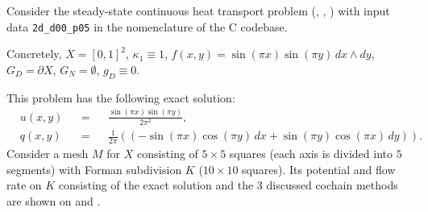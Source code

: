 \begin{example}
  \label{cmc/diffusion/continuous/steady_state/examples/2d_d00_p05-example}
  Consider the steady-state continuous heat transport problem
  (,
   ,
   )
  with input data \verb|2d_d00_p05| in the nomenclature of the C codebase.

  Concretely,
    $X = [0, 1]^2$,
    $\kappa_1 \equiv 1$,
    $f(x, y) = \sin(\pi x) \sin(\pi y) \, d x \wedge d y$,
    $G_D = \partial X$,
    $G_N = \emptyset$,
    $g_D \equiv 0$.

  This problem has the following exact solution:
  \begin{subequations}
    \begin{alignat}{3}
      & u(x, y) && = && \frac{\sin(\pi x) \sin(\pi y)}{2 \pi^2}, \\
      & q(x, y) && = &&
        \frac{1}{2 \pi}
        ((- \sin(\pi x) \cos(\pi y) \, d x + \sin(\pi y) \cos(\pi x)\, d y)).
    \end{alignat}
  \end{subequations}
  Consider a mesh $M$ for $X$ consisting of $5 \times 5$ squares (each axis is
  divided into $5$ segments) with Forman subdivision $K$
  ($10 \times 10$ squares).
  Its potential and flow rate on $K$ consisting of the exact solution and the
  $3$ discussed cochain methods are shown on
  and
  .
\end{example}
